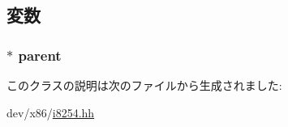 \subsection{変数}
\hypertarget{classX86ISA_1_1I8254_1_1X86Intel8254Timer_a44e5f44b01ebd07b6e85412307f3f3b6}{
\subsubsection[{parent}]{$\ast$ {\bf parent}}}
\label{classX86ISA_1_1I8254_1_1X86Intel8254Timer_a44e5f44b01ebd07b6e85412307f3f3b6}


このクラスの説明は次のファイルから生成されました:\begin{DoxyCompactItemize}
\item 
dev/x86/\hyperlink{i8254_8hh}{i8254.hh}\end{DoxyCompactItemize}
